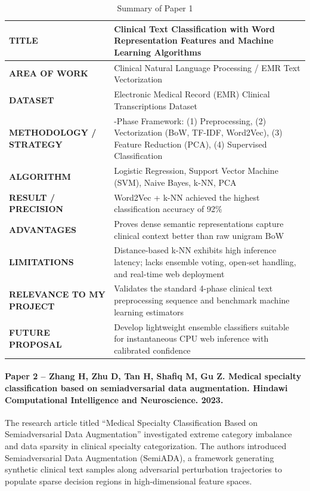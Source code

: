 \begin{table}[H]
\centering
\small
\setlength{\tabcolsep}{5pt}
\begin{tabularx}{\linewidth}{|>{\raggedright\arraybackslash}p{3.8cm}|>{\raggedright\arraybackslash}X|}
\hline
\textbf{TITLE} & Clinical Text Classification with Word Representation Features and Machine Learning Algorithms \cite{omar2023} \\
\hline
\textbf{AREA OF WORK} & Clinical Natural Language Processing / EMR Text Vectorization \\
\hline
\textbf{DATASET} & Electronic Medical Record (EMR) Clinical Transcriptions Dataset \\
\hline
\textbf{METHODOLOGY / STRATEGY} & 4-Phase Framework: (1) Preprocessing, (2) Vectorization (BoW, TF-IDF, Word2Vec), (3) Feature Reduction (PCA), (4) Supervised Classification \\
\hline
\textbf{ALGORITHM} & Logistic Regression, Support Vector Machine (SVM), Naive Bayes, k-NN, PCA \\
\hline
\textbf{RESULT / PRECISION} & Word2Vec + k-NN achieved the highest classification accuracy of 92\% \\
\hline
\textbf{ADVANTAGES} & Proves dense semantic representations capture clinical context better than raw unigram BoW \\
\hline
\textbf{LIMITATIONS} & Distance-based k-NN exhibits high inference latency; lacks ensemble voting, open-set handling, and real-time web deployment \\
\hline
\textbf{RELEVANCE TO MY PROJECT} & Validates the standard 4-phase clinical text preprocessing sequence and benchmark machine learning estimators \\
\hline
\textbf{FUTURE PROPOSAL} & Develop lightweight ensemble classifiers suitable for instantaneous CPU web inference with calibrated confidence \\
\hline
\end{tabularx}
\caption{Summary of Paper 1}
\label{tab:summary_paper1}
\end{table}

\paragraph{Paper 2 -- Zhang H, Zhu D, Tan H, Shafiq M, Gu Z. Medical specialty classification based on semiadversarial data augmentation. Hindawi Computational Intelligence and Neuroscience. 2023.}

The research article titled ``Medical Specialty Classification Based on Semiadversarial Data Augmentation'' \cite{zhang2023} investigated extreme category imbalance and data sparsity in clinical specialty categorization. The authors introduced Semiadversarial Data Augmentation (SemiADA), a framework generating synthetic clinical text samples along adversarial perturbation trajectories to populate sparse decision regions in high-dimensional feature spaces.

